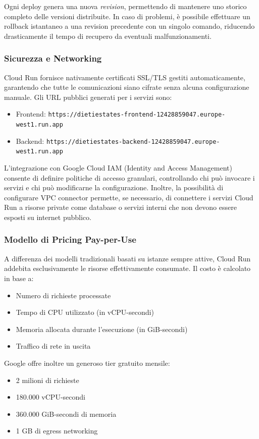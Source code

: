 Ogni deploy genera una nuova \textit{revision}, permettendo di mantenere uno storico completo delle versioni distribuite. In caso di problemi, è possibile effettuare un rollback istantaneo a una revision precedente con un singolo comando, riducendo drasticamente il tempo di recupero da eventuali malfunzionamenti.

\subsubsection{Sicurezza e Networking}
Cloud Run fornisce nativamente certificati SSL/TLS gestiti automaticamente, garantendo che tutte le comunicazioni siano cifrate senza alcuna configurazione manuale. Gli URL pubblici generati per i servizi sono:

\begin{itemize}
    \item Frontend: \texttt{https://dietiestates-frontend-12428859047.europe-west1.run.app}
    \item Backend: \texttt{https://dietiestates-backend-12428859047.europe-west1.run.app}
\end{itemize}

L'integrazione con Google Cloud IAM (Identity and Access Management) consente di definire politiche di accesso granulari, controllando chi può invocare i servizi e chi può modificarne la configurazione. Inoltre, la possibilità di configurare VPC connector permette, se necessario, di connettere i servizi Cloud Run a risorse private come database o servizi interni che non devono essere esposti su internet pubblico.

\subsubsection{Modello di Pricing Pay-per-Use}
A differenza dei modelli tradizionali basati su istanze sempre attive, Cloud Run addebita esclusivamente le risorse effettivamente consumate. Il costo è calcolato in base a:
\begin{itemize}
    \item Numero di richieste processate
    \item Tempo di CPU utilizzato (in vCPU-secondi)
    \item Memoria allocata durante l'esecuzione (in GiB-secondi)
    \item Traffico di rete in uscita
\end{itemize}

Google offre inoltre un generoso tier gratuito mensile:
\begin{itemize}
    \item 2 milioni di richieste
    \item 180.000 vCPU-secondi
    \item 360.000 GiB-secondi di memoria
    \item 1 GB di egress networking
\end{itemize}

